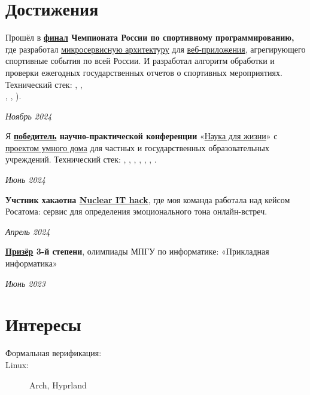 \documentclass[margin,line]{resume}
\begin{document}
\begin{resume}
  \section{\mysidestyle Достижения}
  Прошёл в
  \textbf{\href{https://github.com/alchemmist/CV/blob/main/attachments/russian-chemp-final.pdf}{финал}
    Чемпионата России по спортивному
  программированию,} где разработал
  \href{https://github.com/alchemmist/CV/blob/main/attachments/architect.pdf}{микросервисную
  архитектуру} для
  \href{https://github.com/alchemmist/}{веб-приложения},
  агрегирующего спортивные события по
  всей России. И разработал алгоритм обработки и проверки ежегодных
  государственных
  отчетов о спортивных мероприятиях. Технический стек:
  , , \\
  ,
  ,
).

\vspace{-6mm}

\hfill \textsl{Ноябрь 2024}

Я
\textbf{\href{https://github.com/alchemmist/CV/blob/main/attachments/scince-for-life-win.pdf}{победитель}
научно-практической конференции}
«\href{https://conf.profil.mos.ru/academ}{Наука для
жизни}» с \href{https://github.com/smart-cab/}{проектом умного
дома} для частных и государственных
образовательных учреждений. Технический стек: ,
, , ,
, , .
\vspace{-6mm}

\hfill \textsl{Июнь 2024}

\textbf{Учстник хакаотна \href{https://nuclearhack.mephi.ru/}{Nuclear
IT hack}}, где моя команда работала
над кейсом Росатома: сервис для определения эмоционального тона онлайн-встреч.

\vspace{-6mm}

\hfill \textsl{Апрель 2024}

\textbf{\href{https://github.com/alchemmist/CV/blob/main/attachments/informatics-olimpic.pdf}{Призёр}
3-й степени}, олимпиады МПГУ по информатике:
«Прикладная информатика»
\vspace{-3mm}

\hfill \textsl{Июнь 2023}

\section{\mysidestyle Интересы}\vspace{1mm}
\begin{description}
  \item[Формальная верификация:] 
  \item[Linux:] Arch, Hyprland
\end{description}
\vfill


\end{resume}
\end{document}
